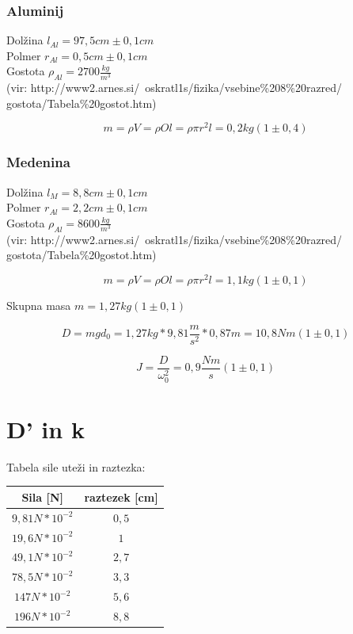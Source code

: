 \documentclass[a4paper]{report}
\begin{document}
\subsubsection*{Aluminij}

Dolžina $l_{Al} = 97,5 cm \pm 0,1 cm $ \\
Polmer $r_{Al} = 0,5 cm \pm 0,1 cm $\\
Gostota $\rho_{Al} = 2700 \frac{kg}{m^3}$ \\
\noindent  (vir: http://www2.arnes.si/~oskratl1s/fizika/vsebine\%208\%20razred/\\
gostota/Tabela\%20gostot.htm)

\[
  m = \rho V = \rho Ol = \rho \pi r^2 l = 0,2 kg (1 \pm 0,4)
\]

\subsubsection*{Medenina}

Dolžina $l_{M} = 8,8 cm \pm 0,1 cm $ \\
Polmer $r_{Al} = 2,2 cm \pm 0,1 cm $\\
Gostota $\rho_{Al} = 8600 \frac{kg}{m^3}$ \\

\noindent  (vir: http://www2.arnes.si/~oskratl1s/fizika/vsebine\%208\%20razred/\\
gostota/Tabela\%20gostot.htm)


\[m = \rho V = \rho Ol = \rho \pi r^2 l = 1, 1 kg (1 \pm 0,1)\]

\noindent Skupna masa $m = 1,27 kg (1 \pm 0,1)$

\[
  D = mgd_0 = 1,27kg * 9,81 \frac{m}{s^2} * 0,87 m = 10,8 Nm (1 \pm 0,1)
\]

\[
  J = \frac{D}{\omega_0^2} =0,9 \frac{Nm}{s} (1 \pm 0,1)
\]


\section*{D' in k}

Tabela sile uteži in raztezka:

\begin{center}
  \begin{tabular}{| c | c |}
    \hline
    Sila [N] & raztezek [cm] \\ \hline
    $9,81 N * 10^{-2}$ & $0,5$ \\ \hline
    $19,6 N * 10^{-2}$ & $1$ \\ \hline
    $49,1 N * 10^{-2}$ & $2,7$ \\ \hline
    $78,5 N * 10^{-2}$ & $3,3$ \\ \hline
    $147 N * 10^{-2}$ & $5,6$ \\ \hline
    $196 N * 10^{-2}$ & $8,8$ \\
    \hline
  \end{tabular}
\end{center}
\end{document}
